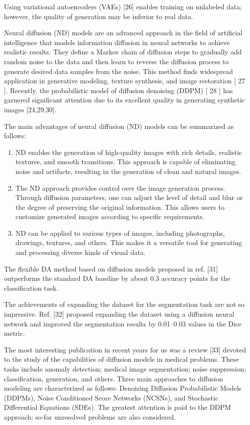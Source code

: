 \documentclass[journal,article,submit,pdftex,moreauthors]{Definitions/mdpi}
\begin{document}
Using variational autoencoders (VAEs) [26] enables training on unlabeled data; however, the quality of generation may be inferior to real data.

Neural diffusion (ND) models are an advanced approach in the field of artificial intelligence that models information diffusion in neural networks to achieve realistic results. They define a Markov chain of diffusion steps to gradually add random noise to the data and then learn to reverse the diffusion process to generate desired data samples from the noise. This method finds widespread application in generative modeling, texture synthesis, and image restoration [ 27 ]. Recently, the probabilistic model of diffusion denoising (DDPM) [ 28 ] has garnered significant attention due to its excellent quality in generating synthetic images [24,29,30].

The main advantages of neural diffusion (ND) models can be summarized as follows:
\begin{enumerate}
	\item {ND enables the generation of high-quality images with rich details, realistic textures,
	and smooth transitions. This approach is capable of eliminating noise and artifacts,
	resulting in the generation of clean and natural images.} 
	\item {The ND approach provides control over the image generation process. Through
	diffusion parameters, one can adjust the level of detail and blur or the degree of
	preserving the original information. This allows users to customize generated images
	according to specific requirements.}
	\item	{ND can be applied to various types of images, including photographs, drawings, textures,
	and others. This makes it a versatile tool for generating and processing diverse kinds of
	visual data.}
\end{enumerate}

The flexible DA method based on diffusion models proposed in ref. [31] outperforms the standard DA baseline by about 0.3 accuracy points for the classification task.

The achievements of expanding the dataset for the segmentation task are not so impressive. Ref. [32] proposed expanding the dataset using a diffusion neural network and improved the segmentation results by 0.01–0.03 values in the Dice metric.

The most interesting publication in recent years for us was a review [33] devoted to the study of the capabilities of diffusion models in medical problems. These tasks include anomaly detection; medical image segmentation; noise suppression; classification, generation, and others. Three main approaches to diffusion modeling are characterized as follows: Denoising Diffusion Probabilistic Models (DDPMs), Noise Conditioned Score Networks (NCSNs), and Stochastic Differential Equations (SDEs). The greatest attention is paid to the DDPM approach; so-far unresolved problems are also considered.
\end{document}
